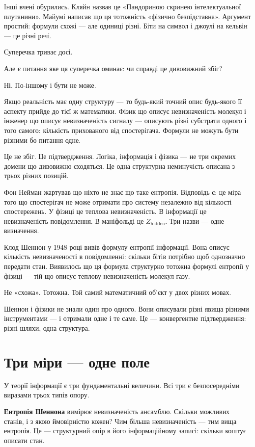 \documentclass[12pt, a4paper, openany]{book}
\begin{document}
Інші вчені обурились. Кляйн назвав це «Пандориною скринею інтелектуальної плутанини». Майумі написав що ця тотожність «фізично безпідставна». Аргумент простий: формули схожі --- але одиниці різні. Біти на символ і джоулі на кельвін --- це різні речі.

Суперечка триває досі.

Але є питання яке ця суперечка оминає: чи справді це дивовижний збіг?

Ні. По-іншому і бути не може.

Якщо реальність має одну структуру --- то будь-який точний опис будь-якого її аспекту прийде до тієї ж математики. Фізик що описує невизначеність молекул і інженер що описує невизначеність сигналу --- описують різні субстрати одного і того самого: кількість прихованого від спостерігача. Формули не можуть бути різними бо питання одне.

Це не збіг. Це підтвердження. Логіка, інформація і фізика --- не три окремих домени що дивовижно сходяться. Це одна структурна неминучість описана з трьох різних позицій.

Фон Нейман жартував що ніхто не знає що таке ентропія. Відповідь є: це міра того що спостерігач не може отримати про систему незалежно від кількості спостережень. У фізиці це теплова невизначеність. В інформації це невизначеність повідомлення. В маніфольді це $Z_{\text{hidden}}$. Три назви --- одне визначення.

Клод Шеннон у 1948 році вивів формулу ентропії інформації. Вона описує кількість невизначеності в повідомленні: скільки бітів потрібно щоб однозначно передати стан. Виявилось що ця формула структурно тотожна формулі ентропії у фізиці — тій що описує теплову невизначеність молекул газу.

Не «схожа». Тотожна. Той самий математичний об'єкт у двох різних мовах.

Шеннон і фізики не знали один про одного. Вони описували різні явища різними інструментами — і отримали одне і те саме. Це — конвергентне підтвердження: різні шляхи, одна структура.

\section{Три міри — одне поле}

У теорії інформації є три фундаментальні величини. Всі три є безпосередніми виразами трьох типів опору.

\textbf{Ентропія Шеннона} вимірює невизначеність ансамблю. Скільки можливих станів, і з якою ймовірністю кожен? Чим більша невизначеність — тим вища ентропія. Це — структурний опір в його інформаційному записі: скільки коштує описати стан.
\end{document}
